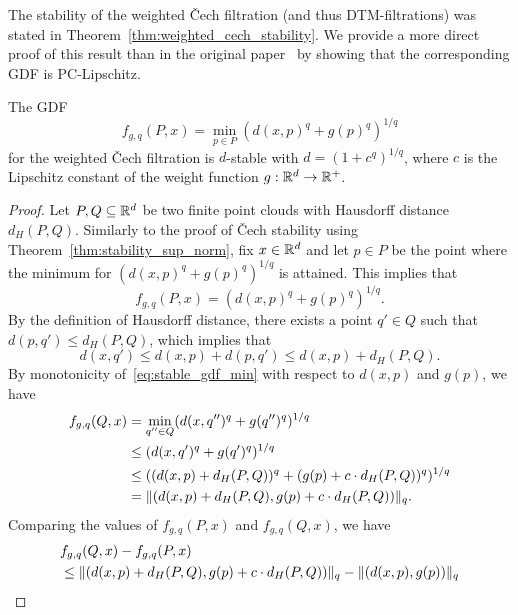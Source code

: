 The stability of the weighted \v{C}ech filtration (and thus DTM-filtrations) was
stated in Theorem~\ref{thm:weighted_cech_stability}. We provide a more direct
proof of this result than in the original paper~\cite{anai2020dtm} by showing
that the corresponding GDF is PC-Lipschitz.

\begin{theorem}
    The GDF
    \begin{equation}
        f_{g, q}(P, x) = \min_{p \in P} (d(x, p)^{q} + g(p)^{q})^{1/q}
    \end{equation}
    for the weighted \v{C}ech filtration is $d$-stable with
    $d = (1 + c^q)^{1/q}$, where $c$ is the Lipschitz constant of the
    weight function $g : \mathbb{R}^d \to \mathbb{R}^+$.
\end{theorem}
\begin{proof}
    Let $P, Q \subseteq \mathbb{R}^d$ be two finite point clouds with Hausdorff distance
    $d_H(P, Q)$. Similarly to the proof of \v{C}ech stability using
    Theorem~\ref{thm:stability_sup_norm}, fix $x \in \mathbb{R}^d$ and let $p \in P$ be
    the point where the minimum for $(d(x, p)^q + g(p)^q)^{1/q}$ is attained.
    This implies that
    \begin{equation}
        \label{eq:stable_gdf_min}
        f_{g, q}(P, x) = (d(x, p)^q + g(p)^q)^{1/q}.
    \end{equation}
    By the definition of Hausdorff distance, there exists a point $q' \in Q$
    such that $d(p, q') \leq d_H(P, Q)$, which implies that
    \begin{equation}
        d(x, q') \leq d(x, p) + d(p, q') \leq d(x, p) + d_H(P, Q).
    \end{equation}
    By monotonicity of~\eqref{eq:stable_gdf_min} with respect to $d(x, p)$ and
    $g(p)$, we have
    \begin{align}
        f_{g, q}(Q, x)
        & = \min_{q'' \in Q} (d(x, q'')^q + g(q'')^q)^{1/q} \\
        & \leq (d(x, q')^q + g(q')^q)^{1/q} \\
        & \leq ((d(x, p) + d_H(P, Q))^q + (g(p) + c \cdot d_H(P, Q))^q)^{1/q} \\
        & = \lVert(d(x, p) + d_H(P, Q), g(p) + c \cdot d_H(P, Q))\rVert_q.
    \end{align}
    Comparing the values of $f_{g, q}(P, x)$ and $f_{g, q}(Q, x)$, we have
    \begin{align}
        & f_{g, q}(Q, x) - f_{g, q}(P, x) \notag \\
        & \leq \norm{(d(x, p) + d_H(P, Q), g(p) + c \cdot d_H(P, Q))}_q - \norm{(d(x, p), g(p))}_q \\

\end{align}
\end{proof}
